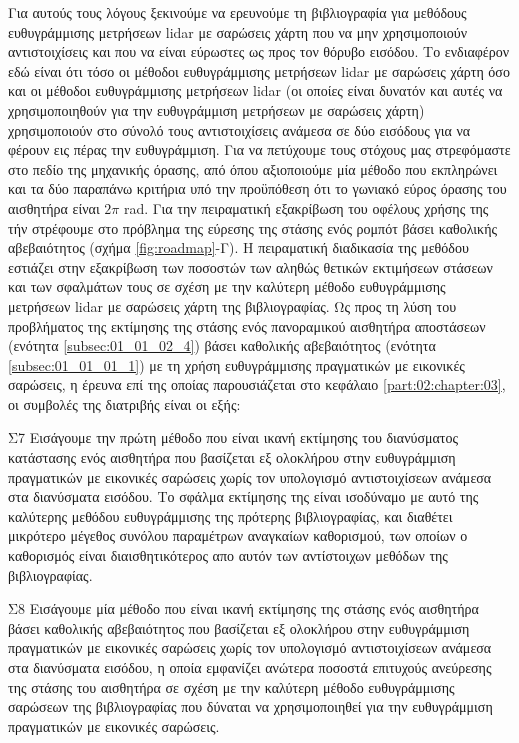 Για αυτούς τους λόγους ξεκινούμε να ερευνούμε τη βιβλιογραφία για μεθόδους
ευθυγράμμισης μετρήσεων lidar με σαρώσεις χάρτη που να μην χρησιμοποιούν
αντιστοιχίσεις και που να είναι εύρωστες ως προς τον θόρυβο εισόδου. Το
ενδιαφέρον εδώ είναι ότι τόσο οι μέθοδοι ευθυγράμμισης μετρήσεων lidar με
σαρώσεις χάρτη όσο και οι μέθοδοι ευθυγράμμισης μετρήσεων lidar (οι οποίες
είναι δυνατόν και αυτές να χρησιμοποιηθούν για την ευθυγράμμιση μετρήσεων με
σαρώσεις χάρτη) χρησιμοποιούν στο σύνολό τους αντιστοιχίσεις ανάμεσα σε δύο
εισόδους για να φέρουν εις πέρας την ευθυγράμμιση. Για να πετύχουμε τους
στόχους μας στρεφόμαστε στο πεδίο της μηχανικής όρασης, από όπου αξιοποιούμε
μία μέθοδο που εκπληρώνει και τα δύο παραπάνω κριτήρια υπό την προϋπόθεση ότι
το γωνιακό εύρος όρασης του αισθητήρα είναι $2\pi$ rad. Για την πειραματική
εξακρίβωση του οφέλους χρήσης της τήν στρέφουμε στο πρόβλημα της εύρεσης της
στάσης ενός ρομπότ βάσει καθολικής αβεβαιότητος (σχήμα \ref{fig:roadmap}-Γ). Η
πειραματική διαδικασία της μεθόδου εστιάζει στην εξακρίβωση των ποσοστών των
αληθώς θετικών εκτιμήσεων στάσεων και των σφαλμάτων τους σε σχέση με την
καλύτερη μέθοδο ευθυγράμμισης μετρήσεων lidar με σαρώσεις χάρτη της
βιβλιογραφίας. Ως προς τη λύση του προβλήματος της εκτίμησης της στάσης ενός
πανοραμικού αισθητήρα αποστάσεων (ενότητα \ref{subsec:01_01_02_4}) βάσει
καθολικής αβεβαιότητος (ενότητα \ref{subsec:01_01_01_1}) με τη χρήση
ευθυγράμμισης πραγματικών με εικονικές σαρώσεις, η έρευνα επί της οποίας
παρουσιάζεται στο κεφάλαιο \ref{part:02:chapter:03}, οι συμβολές της διατριβής
είναι οι εξής:

\begin{bw_box}
\begin{customcontribution}{Σ7}
  \label{contribution:07}
  Εισάγουμε την πρώτη μέθοδο που είναι ικανή εκτίμησης του διανύσματος
  κατάστασης ενός αισθητήρα που βασίζεται εξ ολοκλήρου στην ευθυγράμμιση
  πραγματικών με εικονικές σαρώσεις χωρίς τον υπολογισμό αντιστοιχίσεων ανάμεσα
  στα διανύσματα εισόδου. Το σφάλμα εκτίμησης της είναι ισοδύναμο με αυτό
  της καλύτερης μεθόδου ευθυγράμμισης της πρότερης βιβλιογραφίας, και διαθέτει
  μικρότερο μέγεθος συνόλου παραμέτρων αναγκαίων καθορισμού, των οποίων ο
  καθορισμός είναι διαισθητικότερος απο αυτόν των αντίστοιχων μεθόδων της
  βιβλιογραφίας.  \cite{Filotheou2022e}
\end{customcontribution}
\end{bw_box}

\begin{bw_box}
\begin{customcontribution}{Σ8}
  \label{contribution:08}
  Εισάγουμε μία μέθοδο που είναι ικανή εκτίμησης της στάσης ενός αισθητήρα
  βάσει καθολικής αβεβαιότητος που βασίζεται εξ ολοκλήρου στην ευθυγράμμιση
  πραγματικών με εικονικές σαρώσεις χωρίς τον υπολογισμό αντιστοιχίσεων ανάμεσα
  στα διανύσματα εισόδου, η οποία εμφανίζει ανώτερα ποσοστά επιτυχούς
  ανεύρεσης της στάσης του αισθητήρα σε σχέση με την καλύτερη μέθοδο
  ευθυγράμμισης σαρώσεων της βιβλιογραφίας που δύναται να χρησιμοποιηθεί για
  την ευθυγράμμιση πραγματικών με εικονικές σαρώσεις.
\end{customcontribution}
\end{bw_box}


